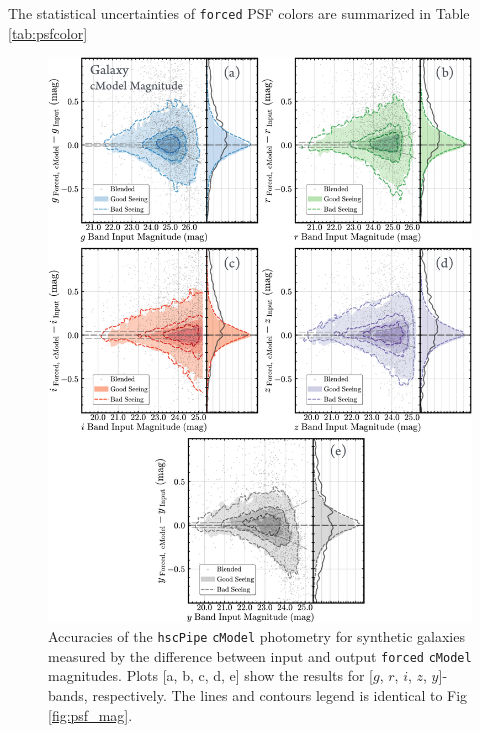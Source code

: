 \documentclass[useamsfonts]{pasj01}
\def\hscpipe{\texttt{hscPipe}}
\def\cmodel{\texttt{cModel}}
\def\forced{\texttt{forced}}
\begin{document}
	The statistical uncertainties of \forced{} PSF colors are summarized in 
	Table \ref{tab:psfcolor}
    

\begin{figure}
    \begin{center}
        \includegraphics[width=16cm]{fig/synpipe_galaxy_mag}
    \end{center}
    \caption{
        Accuracies of the \hscpipe{} \cmodel{} photometry for synthetic
        galaxies measured by the difference between input and output \forced{}
        \cmodel{} magnitudes.
        Plots [a, b, c, d, e] show the results for [$g$, $r$, $i$, $z$, $y$]-bands, 
        respectively.
        The lines and contours legend is identical to Fig \ref{fig:psf_mag}.
        }
    \label{fig:cmodel_mag}
\end{figure}
\end{document}
